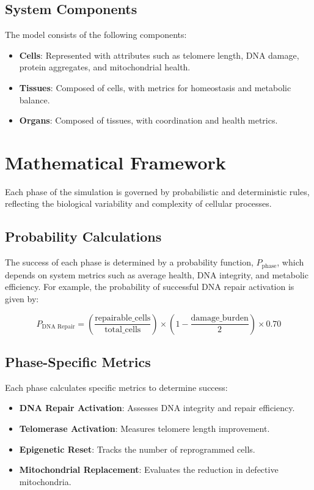 \documentclass{article}
\begin{document}
\subsection{System Components}
The model consists of the following components:
\begin{itemize}
    \item \textbf{Cells}: Represented with attributes such as telomere length, DNA damage, protein aggregates, and mitochondrial health.
    \item \textbf{Tissues}: Composed of cells, with metrics for homeostasis and metabolic balance.
    \item \textbf{Organs}: Composed of tissues, with coordination and health metrics.
\end{itemize}

\section{Mathematical Framework}
Each phase of the simulation is governed by probabilistic and deterministic rules, reflecting the biological variability and complexity of cellular processes.

\subsection{Probability Calculations}
The success of each phase is determined by a probability function, \( P_{\text{phase}} \), which depends on system metrics such as average health, DNA integrity, and metabolic efficiency. For example, the probability of successful DNA repair activation is given by:

\[
P_{\text{DNA Repair}} = \left( \frac{\text{repairable\_cells}}{\text{total\_cells}} \right) \times \left(1 - \frac{\text{damage\_burden}}{2}\right) \times 0.70
\]

\subsection{Phase-Specific Metrics}
Each phase calculates specific metrics to determine success:
\begin{itemize}
    \item \textbf{DNA Repair Activation}: Assesses DNA integrity and repair efficiency.
    \item \textbf{Telomerase Activation}: Measures telomere length improvement.
    \item \textbf{Epigenetic Reset}: Tracks the number of reprogrammed cells.
    \item \textbf{Mitochondrial Replacement}: Evaluates the reduction in defective mitochondria.
\end{itemize}
\end{document}
